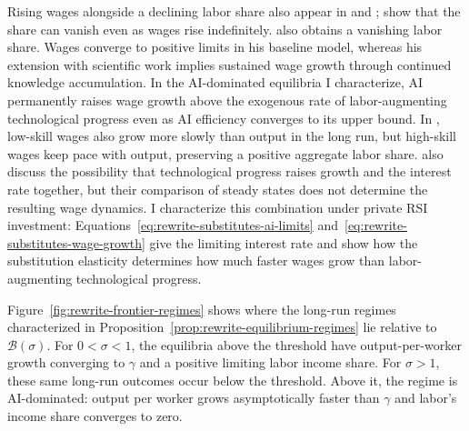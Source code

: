 Rising wages alongside a declining labor share also appear in
\citet{acemoglurestrepo2018} and
\citet{autorkausik2026}; \citet{raymookherjee2022} show that the share
can vanish even as wages rise indefinitely.
\citet{restrepo2025agi} also obtains a vanishing labor share. Wages
converge to positive limits in his baseline model, whereas his extension
with scientific work implies sustained wage growth through continued
knowledge accumulation. In the AI-dominated equilibria I characterize,
AI permanently raises wage growth above the exogenous rate of
labor-augmenting technological progress even as AI efficiency converges
to its upper bound.
In \citet{hemousolsen2022}, low-skill wages also grow more slowly than
output in the long run, but high-skill wages keep pace with output,
preserving a positive aggregate labor share.
\citet{casellimanning2019} also discuss the possibility that technological
progress raises growth and the interest rate together, but their comparison
of steady states does not determine the resulting wage dynamics.
I characterize this combination under private RSI investment:
Equations~\eqref{eq:rewrite-substitutes-ai-limits}
and~\eqref{eq:rewrite-substitutes-wage-growth} give the limiting interest
rate and show how the substitution elasticity determines how much faster
wages grow than labor-augmenting technological progress.

Figure~\ref{fig:rewrite-frontier-regimes} shows where the long-run regimes
characterized in Proposition~\ref{prop:rewrite-equilibrium-regimes} lie
relative to $\mathcal B(\sigma)$. For $0<\sigma<1$, the equilibria above
the threshold have output-per-worker growth converging to $\gamma$ and a
positive limiting labor income share. For $\sigma>1$, these same long-run
outcomes occur below the threshold. Above it, the regime is AI-dominated:
output per worker grows asymptotically faster than $\gamma$ and labor's
income share converges to zero.

